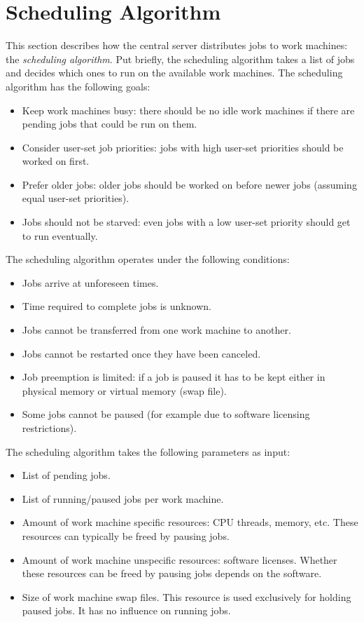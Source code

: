 \chapter{Scheduling Algorithm}
This section describes how the central server distributes jobs to work machines: the \textit{scheduling algorithm}.
Put briefly, the scheduling algorithm takes a list of jobs and decides which ones to run on the available work machines.
The scheduling algorithm has the following goals:
\begin{itemize}
  \item Keep work machines busy: there should be no idle work machines if there are pending jobs that could be run on them.
  \item Consider user-set job priorities: jobs with high user-set priorities should be worked on first.
  \item Prefer older jobs: older jobs should be worked on before newer jobs (assuming equal user-set priorities).
  \item Jobs should not be starved: even jobs with a low user-set priority should get to run eventually.
\end{itemize}
The scheduling algorithm operates under the following conditions:
\begin{itemize}
  \item Jobs arrive at unforeseen times.
  \item Time required to complete jobs is unknown.
  \item Jobs cannot be transferred from one work machine to another.
  \item Jobs cannot be restarted once they have been canceled.
  \item Job preemption is limited: if a job is paused it has to be kept either in physical memory or virtual memory (swap file).
  \item Some jobs cannot be paused (for example due to software licensing restrictions).
\end{itemize}
The scheduling algorithm takes the following parameters as input:
\begin{itemize}
  \item List of pending jobs.
  \item List of running/paused jobs per work machine.
  \item Amount of work machine specific resources: CPU threads, memory, etc.
  These resources can typically be freed by pausing jobs.
  \item Amount of work machine unspecific resources: software licenses.
  Whether these resources can be freed by pausing jobs depends on the software.
  \item Size of work machine swap files.
  This resource is used exclusively for holding paused jobs.
  It has no influence on running jobs.
\end{itemize}
